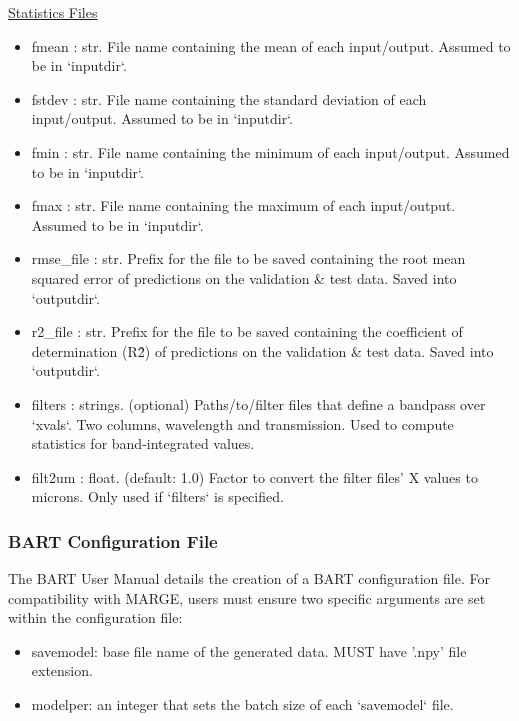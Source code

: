 \documentclass[letterpaper, 12pt]{article}
\begin{document}
\noindent \underline{Statistics Files}
\begin{itemize}
\item fmean      : str.  File name containing the mean of each input/output.
                         Assumed to be in `inputdir`.
\item fstdev     : str.  File name containing the standard deviation of each 
                   input/output.
                         Assumed to be in `inputdir`.
\item fmin       : str.  File name containing the minimum of each input/output.
                         Assumed to be in `inputdir`.
\item fmax       : str.  File name containing the maximum of each input/output.
                         Assumed to be in `inputdir`.
\item rmse\_file  : str.  Prefix for the file to be saved containing the root mean 
                   squared error of predictions on the validation \& test data.
                   Saved into `outputdir`.
\item r2\_file    : str.  Prefix for the file to be saved containing the 
                   coefficient of determination (R\^2) of predictions on the 
                   validation \& test data.
                   Saved into `outputdir`.
\item filters : strings. (optional) Paths/to/filter files that define a 
                   bandpass over `xvals`. 
                   Two columns, wavelength and transmission.
                   Used to compute statistics for band-integrated values.
\item filt2um : float. (default: 1.0) Factor to convert the filter files' 
                       X values to microns. 
                       Only used if `filters` is specified.
\end{itemize}



\subsubsection{BART Configuration File}
\label{sec:BARTconfig}

The BART User Manual details the creation of a BART configuration file.  For 
compatibility with MARGE, users must ensure two specific arguments are set 
within the configuration file:
\begin{itemize}
\item savemodel: base file name of the generated data. MUST have '.npy' file 
                 extension.
\item modelper: an integer that sets the batch size of each `savemodel` file.
\end{itemize}
\end{document}
